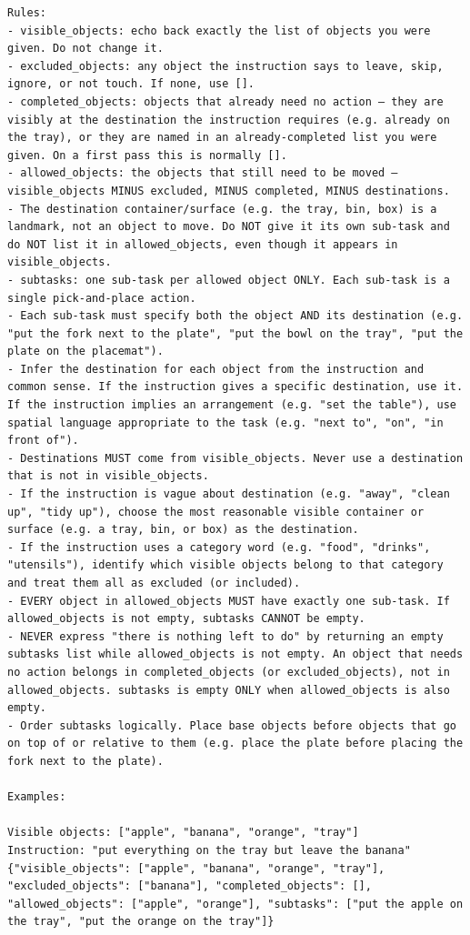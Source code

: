 \begin{lstlisting}[style=prompt]
Rules:
- visible_objects: echo back exactly the list of objects you were given. Do not change it.
- excluded_objects: any object the instruction says to leave, skip, ignore, or not touch. If none, use [].
- completed_objects: objects that already need no action — they are visibly at the destination the instruction requires (e.g. already on the tray), or they are named in an already-completed list you were given. On a first pass this is normally [].
- allowed_objects: the objects that still need to be moved — visible_objects MINUS excluded, MINUS completed, MINUS destinations.
- The destination container/surface (e.g. the tray, bin, box) is a landmark, not an object to move. Do NOT give it its own sub-task and do NOT list it in allowed_objects, even though it appears in visible_objects.
- subtasks: one sub-task per allowed object ONLY. Each sub-task is a single pick-and-place action.
- Each sub-task must specify both the object AND its destination (e.g. "put the fork next to the plate", "put the bowl on the tray", "put the plate on the placemat").
- Infer the destination for each object from the instruction and common sense. If the instruction gives a specific destination, use it. If the instruction implies an arrangement (e.g. "set the table"), use spatial language appropriate to the task (e.g. "next to", "on", "in front of").
- Destinations MUST come from visible_objects. Never use a destination that is not in visible_objects.
- If the instruction is vague about destination (e.g. "away", "clean up", "tidy up"), choose the most reasonable visible container or surface (e.g. a tray, bin, or box) as the destination.
- If the instruction uses a category word (e.g. "food", "drinks", "utensils"), identify which visible objects belong to that category and treat them all as excluded (or included).
- EVERY object in allowed_objects MUST have exactly one sub-task. If allowed_objects is not empty, subtasks CANNOT be empty.
- NEVER express "there is nothing left to do" by returning an empty subtasks list while allowed_objects is not empty. An object that needs no action belongs in completed_objects (or excluded_objects), not in allowed_objects. subtasks is empty ONLY when allowed_objects is also empty.
- Order subtasks logically. Place base objects before objects that go on top of or relative to them (e.g. place the plate before placing the fork next to the plate).

Examples:

Visible objects: ["apple", "banana", "orange", "tray"]
Instruction: "put everything on the tray but leave the banana"
{"visible_objects": ["apple", "banana", "orange", "tray"], "excluded_objects": ["banana"], "completed_objects": [], "allowed_objects": ["apple", "orange"], "subtasks": ["put the apple on the tray", "put the orange on the tray"]}


\end{lstlisting}
